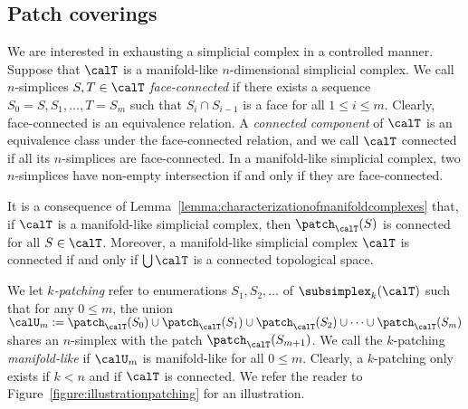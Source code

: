 \subsection{Patch coverings}

We are interested in exhausting a simplicial complex in a controlled manner. 
Suppose that $\calT$ is a manifold-like $n$-dimensional simplicial complex. 
We call $n$-simplices $S,T \in \calT$ \emph{face-connected} if there exists a sequence $S_0=S,S_1,\dots,T=S_m$ such that $S_{i} \cap S_{i-1}$ is a face for all $1 \leq i \leq m$. Clearly, face-connected is an equivalence relation. A \emph{connected component} of $\calT$ is an equivalence class under the face-connected relation, and we call $\calT$ connected if all its $n$-simplices are face-connected. 
In a manifold-like simplicial complex, two $n$-simplices have non-empty intersection if and only if they are face-connected. 

It is a consequence of Lemma~\ref{lemma:characterizationofmanifoldcomplexes} that,
if $\calT$ is a manifold-like simplicial complex, then $\patch_{\calT}(S)$ is connected for all $S \in \calT$.
Moreover, a manifold-like simplicial complex $\calT$ is connected if and only if $\bigcup\calT$ is a connected topological space. 

We let \emph{$k$-patching} refer to enumerations $S_1, S_2, \dots$ of $\subsimplex_{k}(\calT)$
such that for any $0 \leq m$, the union 
$\calU_{m} := \patch_{\calT}(S_0) \cup \patch_{\calT}(S_1) \cup \patch_{\calT}(S_2) \cup \dots \cup \patch_{\calT}(S_m)$
shares an $n$-simplex with the patch $\patch_{\calT}(S_{m+1})$.
We call the $k$-patching \emph{manifold-like} if $\calU_{m}$ is manifold-like for all $0 \leq m$.
Clearly, a $k$-patching only exists if $k < n$ and if $\calT$ is connected. 
We refer the reader to Figure~\ref{figure:illustrationpatching} for an illustration.

